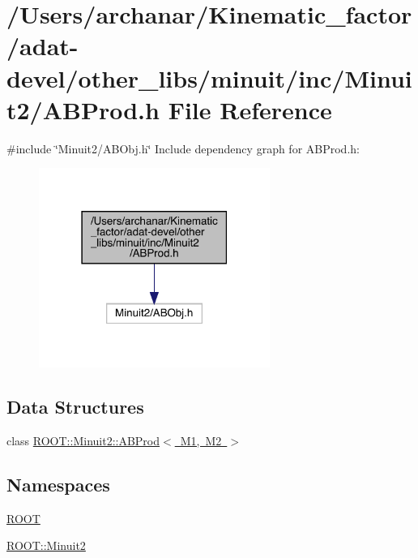 \hypertarget{adat-devel_2other__libs_2minuit_2inc_2Minuit2_2ABProd_8h}{}\section{/\+Users/archanar/\+Kinematic\+\_\+factor/adat-\/devel/other\+\_\+libs/minuit/inc/\+Minuit2/\+A\+B\+Prod.h File Reference}
\label{adat-devel_2other__libs_2minuit_2inc_2Minuit2_2ABProd_8h}
{\ttfamily \#include \char`\"{}Minuit2/\+A\+B\+Obj.\+h\char`\"{}}\newline
Include dependency graph for A\+B\+Prod.\+h\+:
\nopagebreak
\begin{figure}[H]
\begin{center}
\leavevmode
\includegraphics[width=214pt]{d2/d79/adat-devel_2other__libs_2minuit_2inc_2Minuit2_2ABProd_8h__incl}
\end{center}
\end{figure}
\subsection*{Data Structures}
\begin{DoxyCompactItemize}
\item 
class \mbox{\hyperlink{classROOT_1_1Minuit2_1_1ABProd}{R\+O\+O\+T\+::\+Minuit2\+::\+A\+B\+Prod$<$ M1, M2 $>$}}
\end{DoxyCompactItemize}
\subsection*{Namespaces}
\begin{DoxyCompactItemize}
\item 
 \mbox{\hyperlink{namespaceROOT}{R\+O\+OT}}
\item 
 \mbox{\hyperlink{namespaceROOT_1_1Minuit2}{R\+O\+O\+T\+::\+Minuit2}}
\end{DoxyCompactItemize}
